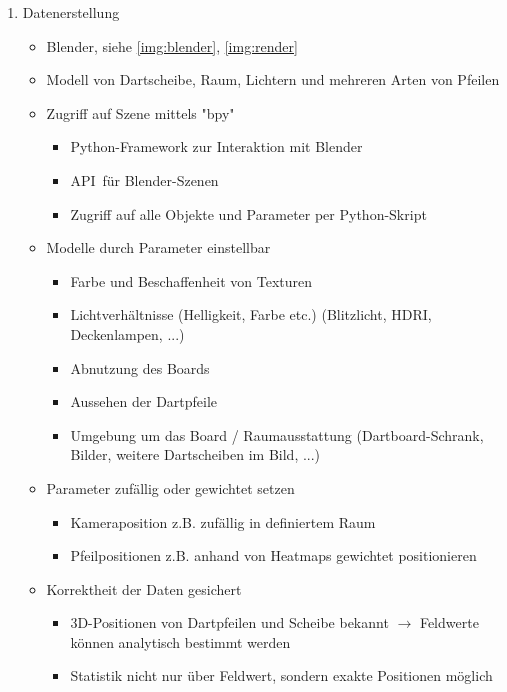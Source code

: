\iffalse
\begin{enumerate}
    \item Datenerstellung
    \begin{itemize}
        \item Blender, siehe \autoref{img:blender}, \autoref{img:render}
        \item Modell von Dartscheibe, Raum, Lichtern und mehreren Arten von Pfeilen

        \item Zugriff auf Szene mittels "bpy"
        \begin{itemize}
            \item Python-Framework zur Interaktion mit Blender
            \item \glqq API\grqq\, für Blender-Szenen
            \item Zugriff auf alle Objekte und Parameter per Python-Skript
        \end{itemize}

        \item Modelle durch Parameter einstellbar
        \begin{itemize}
            \raggedright
            \item Farbe und Beschaffenheit von Texturen
            \item Lichtverhältnisse (Helligkeit, Farbe etc.) (Blitzlicht, HDRI, Deckenlampen, ...)
            \item Abnutzung des Boards
            \item Aussehen der Dartpfeile
            \item Umgebung um das Board / Raumausstattung (Dartboard-Schrank, Bilder, weitere Dartscheiben im Bild, ...)
        \end{itemize}

        \item Parameter zufällig oder gewichtet setzen
        \begin{itemize}
            \item Kameraposition z.B. zufällig in definiertem Raum
            \item Pfeilpositionen z.B. anhand von Heatmaps gewichtet positionieren
        \end{itemize}

        \item Korrektheit der Daten gesichert
        \begin{itemize}
            \item 3D-Positionen von Dartpfeilen und Scheibe bekannt $\rightarrow$ Feldwerte können analytisch bestimmt werden
            \item Statistik nicht nur über Feldwert, sondern exakte Positionen möglich
        \end{itemize}


\end{itemize}
\end{enumerate}
